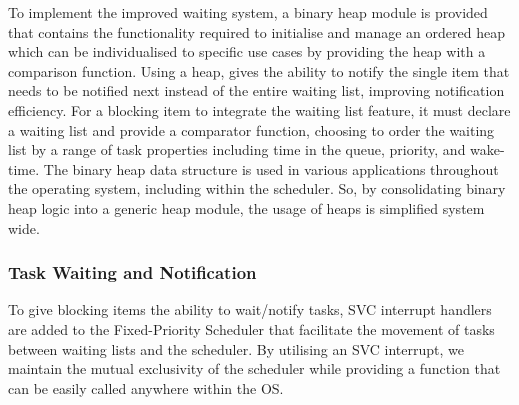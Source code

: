 To implement the improved waiting system, a binary heap module is provided that contains the functionality required to initialise and manage an ordered heap which can be individualised to specific use cases by providing the heap with a comparison function. Using a heap, gives the ability to notify the single item that needs to be notified next instead of the entire waiting list, improving notification efficiency. \hfill\newline
For a blocking item to integrate the waiting list feature, it must declare a waiting list and provide a comparator function, choosing to order the waiting list by a range of task properties including time in the queue, priority, and wake-time. \hfill\newline
The binary heap data structure is used in various applications throughout the operating system, including within the scheduler. So, by consolidating binary heap logic into a generic heap module, the usage of heaps is simplified system wide.
\hfill\newline

\subsubsection{Task Waiting and Notification}
To give blocking items the ability to wait/notify tasks, SVC interrupt handlers are added to the Fixed-Priority Scheduler that facilitate the movement of tasks between waiting lists and the scheduler. By utilising an SVC interrupt, we maintain the mutual exclusivity of the scheduler while providing a function that can be easily called anywhere within the OS.